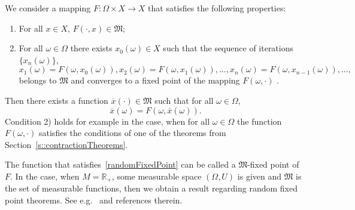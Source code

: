 \documentclass[12pt]{amsart}          %
\newcommand{\RR}{\mathbb R}
\begin{document}
We consider a mapping $F\colon \Omega\times X\to X$ that satisfies the following properties:
\begin{enumerate}[label={\arabic*)}]
    \item For all $ x\in X$, $F(\cdot,x)\in \mathfrak{M}$;
    \item For all  $\omega\in \Omega$ there exists $x_0(\omega)\in X$ such that the sequence of iterations
    $\{ x_n(\omega)\}$,
    $$
    x_1(\omega)=F(\omega,x_0(\omega)),x_2(\omega)=F(\omega,x_1(\omega)),\ldots,x_n(\omega)=F(\omega,x_{n-1}(\omega)),\ldots,
    $$
    belongs to  $\mathfrak{M}$ and converges to a fixed point of the mapping $F(\omega,\cdot)$ .
\end{enumerate}
Then there exists a function $\overline{x}(\cdot)\in\mathfrak{M} $ such that for all $\omega\in \Omega$,
\begin{equation}\label{randomFixedPoint}
\overline{x}(\omega)=F(\omega,\overline{x}(\omega)).
\end{equation}
Condition 2) holds for example in the case, when for all  $\omega\in \Omega$ the function $F(\omega,\cdot)$ satisfies the conditions of one of the theorems from Section~\ref{s::contractionTheorems}.

The function that satisfies~\eqref{randomFixedPoint} can be called a $\mathfrak{M}$-fixed point of $F$. In the case, when $M=\RR_+$, some measurable space $(\Omega, U)$ is given and $\mathfrak{M}$ is the set of measurable functions, then we obtain a result regarding random fixed point theorems. See e.g.~\cite{Nietoatall} and references therein.




\end{document}

